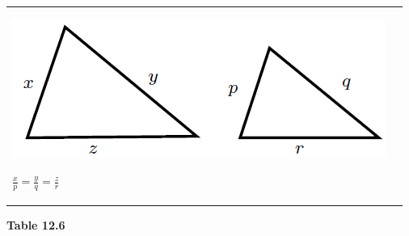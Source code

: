 \begin{center}
\begin{xtabular*}{\mytablewidth}[t]{|p{10\mystarwidth}|p{10\mystarwidth}|}
    \setcounter{subfigure}{0}
\label{m39368*id318279}
    \begin{center}
    \label{m39368*id318279!!!underscore!!!media}\label{m39368*id318279!!!underscore!!!printimage}\includegraphics[width=.25\columnwidth]{col11306.imgs/m39368_MG10C13_036.png} %
      \vspace{2pt}
    \vspace{.1in}
    \end{center}    
                    \begin{math}\frac{x}{p}=\frac{y}{q}=\frac{z}{r}\end{math}
     \tabularnewline{}
    \end{xtabular*}
      \end{center}
    \begin{center}{\small\bfseries Table 12.6}\end{center}
    \par
        \label{m39368*uid49}
